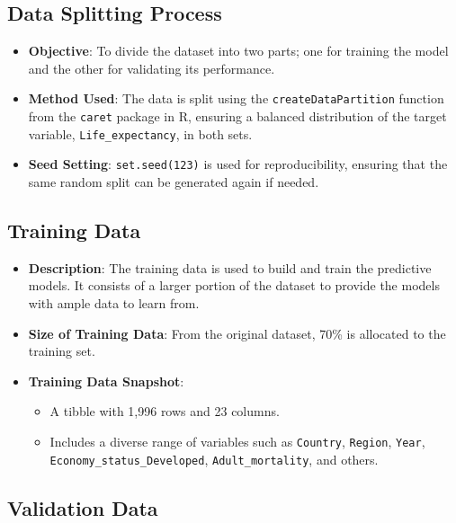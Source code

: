 \documentclass[
]{article}
\providecommand{\tightlist}{%
  \setlength{\itemsep}{0pt}\setlength{\parskip}{0pt}}
\begin{document}
\hypertarget{data-splitting-process}{%
\subsection{Data Splitting Process}\label{data-splitting-process}}

\begin{itemize}
\tightlist
\item
  \textbf{Objective}: To divide the dataset into two parts; one for
  training the model and the other for validating its performance.
\item
  \textbf{Method Used}: The data is split using the
  \texttt{createDataPartition} function from the \texttt{caret} package
  in R, ensuring a balanced distribution of the target variable,
  \texttt{Life\_expectancy}, in both sets.
\item
  \textbf{Seed Setting}: \texttt{set.seed(123)} is used for
  reproducibility, ensuring that the same random split can be generated
  again if needed.
\end{itemize}

\hypertarget{training-data}{%
\subsection{Training Data}\label{training-data}}

\begin{itemize}
\tightlist
\item
  \textbf{Description}: The training data is used to build and train the
  predictive models. It consists of a larger portion of the dataset to
  provide the models with ample data to learn from.
\item
  \textbf{Size of Training Data}: From the original dataset, 70\% is
  allocated to the training set.
\item
  \textbf{Training Data Snapshot}:

  \begin{itemize}
  \tightlist
  \item
    A tibble with 1,996 rows and 23 columns.
  \item
    Includes a diverse range of variables such as \texttt{Country},
    \texttt{Region}, \texttt{Year}, \texttt{Economy\_status\_Developed},
    \texttt{Adult\_mortality}, and others.
  \end{itemize}
\end{itemize}

\hypertarget{validation-data}{%
\subsection{Validation Data}\label{validation-data}}
\end{document}

